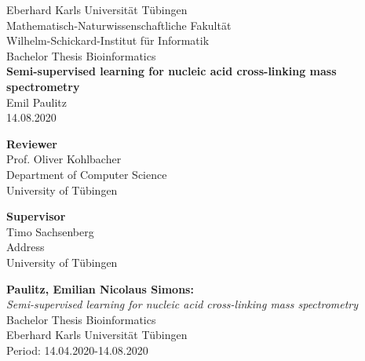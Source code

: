 \documentclass[twoside,12pt,a4paper]{report}
\begin{document}
 
\begin{titlepage}
 \begin{center}
  {\LARGE Eberhard Karls Universit\"at T\"ubingen}\\
  {\large Mathematisch-Naturwissenschaftliche Fakultät \\
Wilhelm-Schickard-Institut f\"ur Informatik\\[4cm]}
  {\huge Bachelor Thesis Bioinformatics\\[2cm]}
  {\Large\bf  Semi-supervised learning for nucleic acid cross-linking mass spectrometry\\[1.5cm]}
 {\large Emil Paulitz}\\[0.5cm]
14.08.2020\\[3cm]
\begin{center}
{\small\bf Reviewer}\\[0.5cm]
 {\large Prof. Oliver Kohlbacher}\\
  {\footnotesize Department of Computer Science\\
	University of T\"ubingen}
  \end{center}
	
\begin{center}
{\small\bf Supervisor}\\[0.5cm]
  {\large Timo Sachsenberg}\\
  {\footnotesize Address\\
	University of T\"ubingen}\end{center}

  \end{center}
\end{titlepage}

\thispagestyle{empty}
\vspace*{\fill}
\begin{minipage}{11.2cm}
\textbf{Paulitz, Emilian Nicolaus Simons:}\\
\emph{Semi-supervised learning for nucleic acid cross-linking mass spectrometry}\\ Bachelor Thesis Bioinformatics\\
Eberhard Karls Universit\"at T\"ubingen\\
Period: 14.04.2020-14.08.2020
\end{minipage}
\newpage
\end{document}
